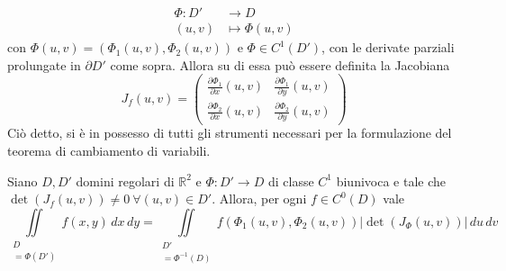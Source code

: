 \begin{equation}
\begin{aligned}
    \Phi: D' &\to D\\
    (u,v) &\mapsto \Phi(u,v)
\end{aligned}
\end{equation}
con $\Phi(u,v)=(\Phi_1(u,v), \Phi_2(u,v))$ e $\Phi \in C^1(D')$, con le derivate parziali prolungate in $\partial D'$ come sopra. Allora su di essa può essere definita la Jacobiana 
\begin{equation}
    J_f(u,v)=\begin{pmatrix}
        \frac{\partial \Phi_1}{\partial x}(u,v) & \frac{\partial \Phi_1}{\partial y} (u,v)\\
        \frac{\partial \Phi_2}{\partial x} (u,v) & \frac{\partial \Phi_2}{\partial y} (u,v)
    \end{pmatrix}
\end{equation}
Ciò detto, si è in possesso di tutti gli strumenti necessari per la formulazione del teorema di cambiamento di variabili.
\begin{theorem} \label{Teo: Formula cambiamento variabili}
    Siano $D, D'$ domini regolari di $\mathbb{R}^2$ e $\Phi: D' \to D$ di classe $C^1$ biunivoca e tale che $\det(J_f(u,v)) \neq 0\ \forall(u,v) \in D'$. Allora, per ogni $f \in C^0(D)$ vale
    \begin{equation} \label{Eq: Formula cambiamento di variabili}
        \iint\limits_{\substack{D\\=\Phi(D')}}
        f(x,y)\,dx\,dy= \iint\limits_{\substack{D'\\=\Phi^{-1}(D)}}{f(\Phi_1(u,v), \Phi_2(u,v))\left|\det(J_\Phi(u,v))\right|}\,du\,dv
    \end{equation}
\end{theorem}
